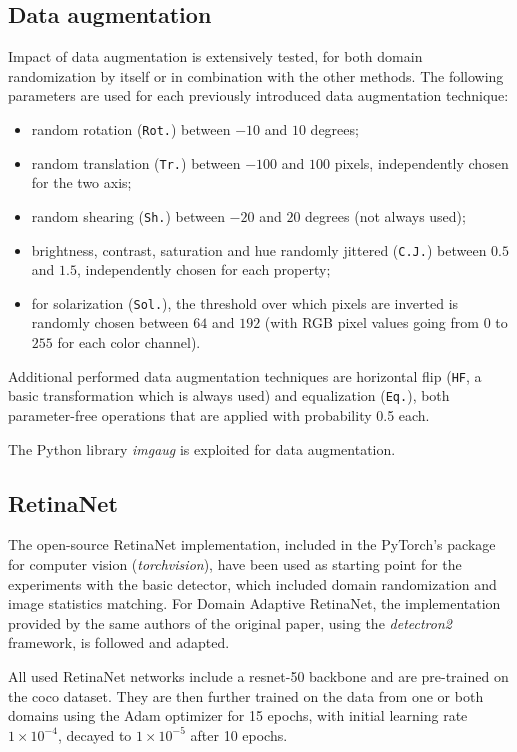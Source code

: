 \documentclass[%
    corpo=12pt,
    twoside,
    stile=classica,   
    tipotesi=magistrale,
    evenboxes,
    english,
	numerazioneromana,
]{toptesi}
\begin{document}
\subsection{Data augmentation}
Impact of data augmentation is extensively tested, for both domain randomization by itself or in combination with the other methods. The following parameters are used for each previously introduced data augmentation technique:
\begin{itemize}
	\item random rotation (\texttt{Rot.}) between $ -10 $ and $ 10 $ degrees;
	\item random translation (\texttt{Tr.}) between $ -100 $ and $ 100 $ pixels, independently chosen for the two axis;
	\item random shearing (\texttt{Sh.}) between $-20$ and $20$ degrees (not always used);
	\item brightness, contrast, saturation and hue randomly jittered (\texttt{C.J.}) between $ 0.5 $ and $ 1.5 $, independently chosen for each property;
	\item for solarization (\texttt{Sol.}), the threshold over which pixels are inverted is randomly chosen between $ 64 $ and $ 192 $ (with RGB pixel values going from $ 0 $ to $ 255 $ for each color channel).
\end{itemize}

Additional performed data augmentation techniques are horizontal flip (\texttt{HF}, a basic transformation which is always used) and equalization (\texttt{Eq.}), both parameter-free operations that are applied with probability 0.5 each.

\bigskip
The Python library \textit{imgaug}\cite{imgaug} is exploited for data augmentation.

\subsection{RetinaNet}
The open-source RetinaNet implementation, included in the PyTorch's package for computer vision (\textit{torchvision})\cite{torchvision_retinanet}, have been used as starting point for the experiments with the basic detector, which included domain randomization and image statistics matching. For Domain Adaptive RetinaNet, the implementation provided by the same authors of the original paper\cite{pasqualino2020unsupervised}, using the \textit{detectron2} framework\cite{wu2019detectron2}\cite{daretinanet_github}, is followed and adapted.

\bigskip
All used RetinaNet networks include a \gls{resnet}-50 backbone and are pre-trained on the \gls{coco} dataset. They are then further trained on the data from one or both domains using the Adam optimizer for 15 epochs, with initial learning rate $1\times 10^{-4}$, decayed to $1\times 10^{-5}$ after 10 epochs.
\end{document}
